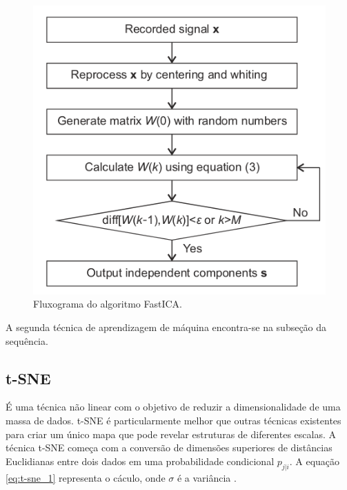 \begin{figure}[H]
    \caption{Fluxograma do algoritmo FastICA.}
    \begin{center}
        \includegraphics[scale=.5]{referencial/img/fatica_fang_p3.png}
    \end{center}
    \label{fig:fatica_fang_p3}
\end{figure}

A segunda técnica de aprendizagem de máquina encontra-se na subseção da sequência.


% 

\subsection{t-SNE}

É uma técnica não linear com o objetivo de reduzir a dimensionalidade de uma massa de dados. t-SNE é particularmente melhor que 
outras técnicas existentes para criar um único mapa que pode revelar estruturas de diferentes escalas. A técnica t-SNE começa com a 
conversão de dimensões superiores de distâncias Euclidianas entre dois dados em uma probabilidade condicional
$p_{j|i}$. A equação \ref{eq:t-sne_1} representa o cáculo, onde $\sigma$ é a variância \cite{VanDerMaaten2008}.

